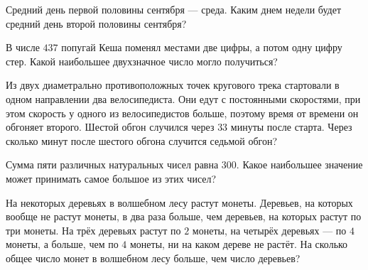 \begin{listofex}
	\item Средний день первой половины сентября --- среда. Каким днем недели будет средний день второй половины сентября?
	\item В числе \( 437 \) попугай Кеша поменял местами две цифры, а потом одну цифру стер. Какой наибольшее двухзначное число могло получиться?
	\item Из двух диаметрально противоположных точек кругового трека стартовали в одном направлении два велосипедиста. Они едут с постоянными скоростями, при этом скорость у одного из велосипедистов больше, поэтому время от времени он обгоняет второго. Шестой обгон случился через \( 33 \) минуты после старта. Через сколько минут после шестого обгона случится седьмой обгон?
	\item Сумма пяти различных натуральных чисел равна \( 300 \). Какое наибольшее значение может принимать самое большое из этих чисел?
	\item На некоторых деревьях в волшебном лесу растут монеты. Деревьев, на которых вообще не растут монеты, в два раза больше, чем деревьев, на которых растут по
	три монеты. На трёх деревьях растут по \( 2 \) монеты, на четырёх деревьях — по \( 4 \) монеты, а
	больше, чем по \( 4 \) монеты, ни на каком дереве не растёт. На сколько общее число монет в
	волшебном лесу больше, чем число деревьев?
\end{listofex}